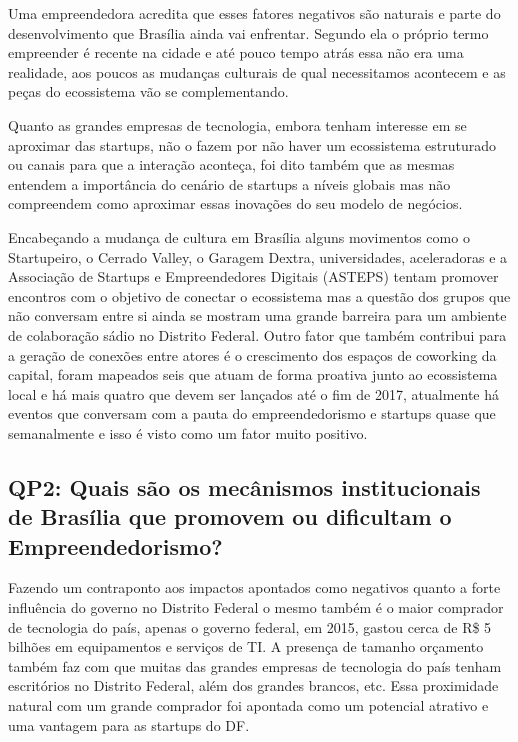 Uma empreendedora acredita que esses fatores negativos são naturais e parte do desenvolvimento que Brasília ainda vai enfrentar. Segundo ela o próprio termo empreender é recente na cidade e até pouco tempo atrás essa não era uma realidade, aos poucos as mudanças culturais de qual necessitamos acontecem e as peças do ecossistema vão se complementando.

Quanto as grandes empresas de tecnologia, embora tenham interesse em se aproximar das startups, não o fazem por não haver um ecossistema estruturado ou canais para que a interação aconteça, foi dito também que as mesmas entendem a importância do cenário de startups a níveis globais mas não compreendem como aproximar essas inovações do seu modelo de negócios.

Encabeçando a mudança de cultura em Brasília alguns movimentos como o Startupeiro, o Cerrado Valley, o Garagem Dextra, universidades, aceleradoras e a Associação de Startups e Empreendedores Digitais (ASTEPS) tentam promover encontros com o objetivo de conectar o ecossistema mas a questão dos grupos que não conversam entre si ainda se mostram uma grande barreira para um ambiente de colaboração sádio no Distrito Federal. Outro fator que também contribui para a geração de conexões entre atores é o crescimento dos espaços de coworking da capital, foram mapeados seis que atuam de forma proativa junto ao ecossistema local e há mais quatro que devem ser lançados até o fim de 2017, atualmente há eventos que conversam com a pauta do empreendedorismo e startups quase que semanalmente e isso é visto como um fator muito positivo. 


\subsection{QP2: Quais são os mecânismos institucionais de Brasília que promovem ou dificultam o Empreendedorismo?}
\label{subsection:pergunta_de_pesquisa_2}

Fazendo um contraponto aos impactos apontados como negativos quanto a forte influência do governo no Distrito Federal o mesmo também é o maior comprador de tecnologia do país, apenas o governo federal, em 2015, gastou cerca de R\$ 5 bilhões em equipamentos e serviços de TI. A presença de tamanho orçamento também faz com que muitas das grandes empresas de tecnologia do país tenham escritórios no Distrito Federal, além dos grandes brancos, etc. Essa proximidade natural com um grande comprador foi apontada como um potencial atrativo e uma vantagem para as startups do DF. 

